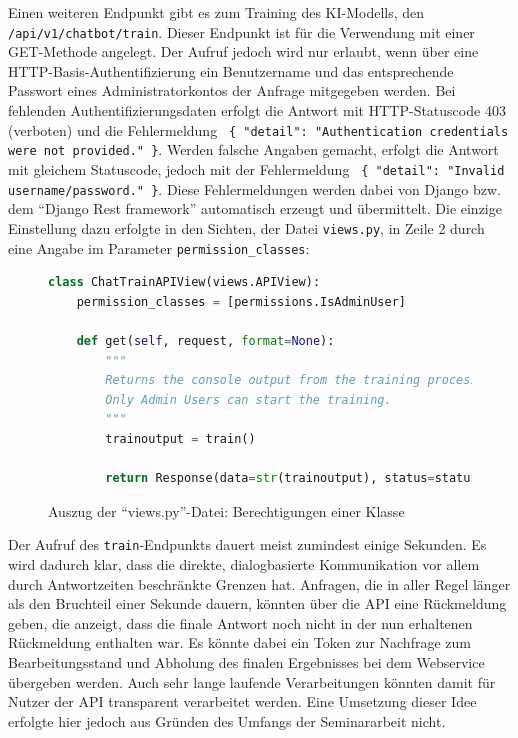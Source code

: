 \documentclass[12pt,oneside,titlepage,listof=totoc,bibliography=totoc]{scrartcl}
\newcommand{\code}[1]{\colorbox{code-gray}{\texttt{#1}}}
\begin{document}
Einen weiteren Endpunkt gibt es zum Training des KI-Modells, den \code{/api/v1/chatbot/train}. Dieser Endpunkt ist für die Verwendung mit einer GET-Methode angelegt. Der Aufruf jedoch wird nur erlaubt, wenn über eine HTTP-Basis-Authentifizierung ein Benutzername und das entsprechende Passwort eines Administratorkontos der Anfrage mitgegeben werden. Bei fehlenden Authentifizierungsdaten erfolgt die Antwort mit HTTP-Statuscode 403 (verboten) und die Fehlermeldung \code{ \{ "detail": "Authentication credentials were not provided." \}}. Werden falsche Angaben gemacht, erfolgt die Antwort mit gleichem Statuscode, jedoch mit der Fehlermeldung \code{ \{ "detail": "Invalid username/password." \}}. Diese Fehlermeldungen werden dabei von Django bzw. dem \enquote{Django Rest framework} automatisch erzeugt und übermittelt. Die einzige Einstellung dazu erfolgte in den Sichten, der Datei \code{views.py}, in Zeile 2 durch eine Angabe im Parameter \code{permission_classes}:

\begin{figure}[H]
	\caption{Auszug der \enquote{views.py}-Datei: Berechtigungen einer Klasse}
	\label{fig:code-django-views-admin-only}
\begin{lstlisting}[language=python]
class ChatTrainAPIView(views.APIView):
    permission_classes = [permissions.IsAdminUser]

    def get(self, request, format=None):
        """
        Returns the console output from the training process.
        Only Admin Users can start the training.
        """
        trainoutput = train()
        
        return Response(data=str(trainoutput), status=status.HTTP_200_OK)
\end{lstlisting}
\end{figure}

Der Aufruf des \code{train}-Endpunkts dauert meist zumindest einige Sekunden. Es wird dadurch klar, dass die direkte, dialogbasierte Kommunikation vor allem durch Antwortzeiten beschränkte Grenzen hat. Anfragen, die in aller Regel länger als den Bruchteil einer Sekunde dauern, könnten über die API eine Rückmeldung geben, die anzeigt, dass die finale Antwort noch nicht in der nun erhaltenen Rückmeldung enthalten war. Es könnte dabei ein Token zur Nachfrage zum Bearbeitungsstand und Abholung des finalen Ergebnisses bei dem Webservice übergeben werden. Auch sehr lange laufende Verarbeitungen könnten damit für Nutzer der API transparent verarbeitet werden. Eine Umsetzung dieser Idee erfolgte hier jedoch aus Gründen des Umfangs der Seminararbeit nicht. 
\end{document}
